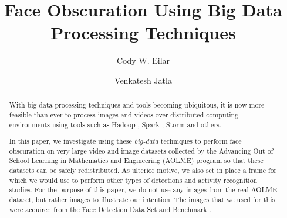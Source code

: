 \documentclass[
	submission,
	final,
	notitlepage,
	narroweqnarray,
	inline,
	twoside,
	]{ieee}
\begin{document}
\title{Face Obscuration Using Big Data Processing Techniques}

\author[EILAR AND VENKATESH]{Cody W. Eilar
       \and{} Venkatesh Jatla
}


\maketitle

\begin{abstract}
  With big data processing techniques and tools becoming ubiquitous, it
  is now more feasible than ever to process images and videos over
  distributed computing environments using tools such as Hadoop \cite{hadoop}, Spark \cite{spark}, Storm \cite{storm} and others.

  In this paper, we investigate
  using these \textit{big-data} techniques to perform face obscuration on very large
  video and image datasets collected by the Advancing Out of School Learning in
  Mathematics and Engineering (AOLME) program so that these datasets can be
  safely redistributed. As ulterior motive, we also set in place a frame for
  which we would use to perform other types of detections and activity
  recognition studies. For the purpose of this paper, we do not use any images
  from the real AOLME dataset, but rather images to illustrate our intention.
  The images that we used for this were acquired from the Face Detection Data Set
  and Benchmark \cite{fddbTech}.
\end{abstract}
\end{document}
